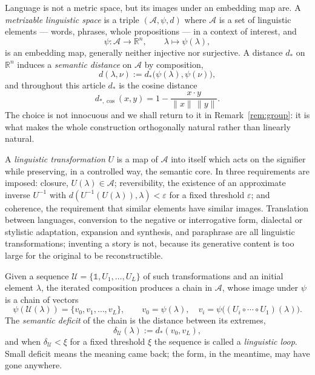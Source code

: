 \documentclass[11pt,a4paper]{article}
\theoremstyle{plain}
\theoremstyle{definition}
\numberwithin{equation}{section}
\newcommand{\R}{\mathbb{R}}
\newcommand{\A}{\mathscr{A}}
\newcommand{\Uc}{\mathcal{U}}
\newcommand{\eps}{\varepsilon}
\begin{document}
Language is not a metric space, but its images under an embedding map
are. A \emph{metrizable linguistic space} is a triple
$(\A,\psi,d)$ where $\A$ is a set of linguistic elements --- words,
phrases, whole propositions --- in a context of interest, and
\begin{equation}\label{eq:embed}
\psi : \A \longrightarrow \R^n , \qquad \lambda \longmapsto \psi(\lambda),
\end{equation}
is an embedding map, generally neither injective nor surjective. A
distance $d_*$ on $\R^n$ induces a \emph{semantic distance} on $\A$ by
composition,
\begin{equation}\label{eq:semdist}
d(\lambda,\nu) := d_*\bigl(\psi(\lambda),\psi(\nu)\bigr),
\end{equation}
and throughout this article $d_*$ is the cosine distance
\begin{equation}\label{eq:cosine}
d_{*,\cos}(x,y) = 1 - \frac{x\cdot y}{\|x\|\,\|y\|}.
\end{equation}
The choice is not innocuous and we shall return to it in
Remark~\ref{rem:group}: it is what makes the whole construction
orthogonally natural rather than linearly natural.

A \emph{linguistic transformation} $U$ is a map of $\A$ into itself which
acts on the signifier while preserving, in a controlled way, the
semantic core. In \cite{CM25} three requirements are imposed: closure,
$U(\lambda) \in \A$; reversibility, the existence of an approximate
inverse $U^{-1}$ with $d(U^{-1}(U(\lambda)),\lambda) < \eps$ for a fixed
threshold $\eps$; and coherence, the requirement that similar elements
have similar images. Translation between languages, conversion to the
negative or interrogative form, dialectal or stylistic adaptation,
expansion and synthesis, and paraphrase are all linguistic
transformations; inventing a story is not, because its generative
content is too large for the original to be reconstructible.

Given a sequence $\Uc = \{\mathbb{1}, U_1, \dots, U_L\}$ of such
transformations and an initial element $\lambda$, the iterated
composition produces a chain in $\A$, whose image under $\psi$ is a
chain of vectors
\begin{equation}\label{eq:chain}
\psi(\Uc(\lambda)) = \{v_0, v_1, \dots, v_L\}, \qquad
v_0 = \psi(\lambda), \quad
v_i = \psi\bigl((U_i \circ \cdots \circ U_1)(\lambda)\bigr).
\end{equation}
The \emph{semantic deficit} of the chain is the distance between its
extremes,
\begin{equation}\label{eq:deficit}
\delta_\Uc(\lambda) := d_*(v_0, v_L),
\end{equation}
and when $\delta_\Uc < \xi$ for a fixed threshold $\xi$ the sequence is
called a \emph{linguistic loop}. Small deficit means the meaning came
back; the form, in the meantime, may have gone anywhere.
\end{document}
